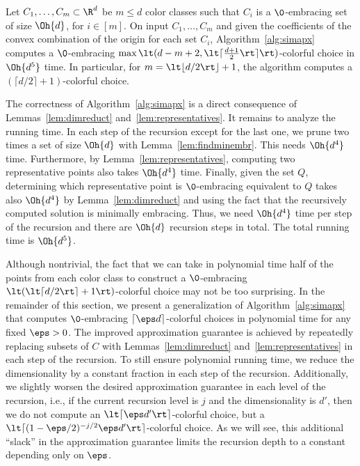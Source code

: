 \begin{theorem}\label{thm:simpledimreduct}
  Let $C_1, \ldots, C_m\subset \R^d$ be
  $m\leq d$ color classes such that $C_i$ is a $\0$-embracing set
  of size $\Oh{d}$, for $i \in [m]$. On input $C_1,\dots,C_m$ and given the
  coefficients of the convex combination of the origin for each set $C_i$,
  Algorithm~\ref{alg:simapx} computes a $\0$-embracing $\max\lt(d-m+2,
  \lt\lceil\frac{d+1}{2}\rt\rceil\rt)$-colorful choice in $\Oh{d^5}$ time.
  In particular, for $m=\lt\lfloor d / 2 \rt\rfloor + 1$, the algorithm 
  computes a $(\lceil d/2\rceil +1)$-colorful choice.
\end{theorem}
\begin{prf}
  The correctness of Algorithm~\ref{alg:simapx} is a direct consequence of
  Lemmas~\ref{lem:dimreduct} and~\ref{lem:representatives}. It remains to
  analyze the running time. In each step of the recursion except for the 
  last one, we prune two times a set of size $\Oh{d}$ with
  Lemma~\ref{lem:findminembr}. This needs $\Oh{d^4}$ time. Furthermore, by
  Lemma~\ref{lem:representatives}, computing two representative points 
  also takes $\Oh{d^4}$ time. Finally, given the set $Q$, determining which
  representative point is $\0$-embracing equivalent to $Q$ takes also 
  $\Oh{d^4}$ by Lemma~\ref{lem:dimreduct} and using the fact that
  the recursively computed solution is minimally embracing. Thus, we 
  need $\Oh{d^4}$ time per step of the recursion and there are 
  $\Oh{d}$ recursion steps in total. The total running time is 
  $\Oh{d^5}$.
\end{prf}

Although nontrivial, the fact that we can take in polynomial time 
half of the points from each color class to construct a $\0$-embracing
$\lt(\lt\lceil d/2\rt\rceil+1\rt)$-colorful choice may not be too 
surprising.  In the remainder of this section, we present a 
generalization of Algorithm~\ref{alg:simapx} that computes 
$\0$-embracing $\lceil \eps d\rceil$-colorful choices in 
polynomial time for any fixed $\eps > 0$. The improved approximation
guarantee is achieved by repeatedly replacing subsets of $C$ with
Lemmas~\ref{lem:dimreduct} and~\ref{lem:representatives} in each 
step of the recursion. To still ensure polynomial running time, we 
reduce the dimensionality by a constant fraction in each step of 
the recursion. Additionally, we slightly worsen the desired 
approximation guarantee in each level of the recursion, i.e., if the
current recursion level is $j$ and the dimensionality is $d'$, then 
we do not compute an $\lt\lceil \eps d'\rt\rceil$-colorful
choice, but a $\lt\lceil (1-\eps/2)^{-j/2} \eps d'\rt\rceil$-colorful
choice. As we will see, this additional ``slack'' in the approximation 
guarantee limits the recursion depth to a constant depending only on 
$\eps$. 

